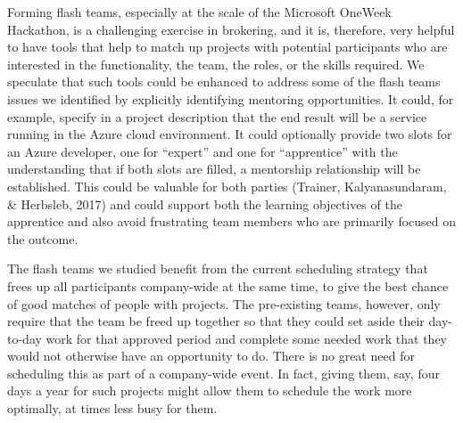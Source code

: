 \documentclass{hcij}
\begin{document}
Forming flash teams, especially at the scale of the Microsoft OneWeek Hackathon, is a challenging exercise in brokering, and it is, therefore, very helpful to have tools that help to match up projects with potential participants who are interested in the functionality, the team, the roles, or the skills required. We speculate that such tools could be enhanced to address some of the flash teams issues we identified by explicitly identifying mentoring opportunities. It could, for example, specify in a project description that the end result will be a service running in the Azure cloud environment. It could optionally provide two slots for an Azure developer, one for “expert” and one for “apprentice” with the understanding that if both slots are filled, a mentorship relationship will be established. This could be valuable for both parties (Trainer, Kalyanasundaram, & Herbsleb, 2017) and could support both the learning objectives of the apprentice and also avoid frustrating team members who are primarily focused on the outcome.

The flash teams we studied benefit from the current scheduling strategy that frees up all participants company-wide at the same time, to give the best chance of good matches of people with projects.  The pre-existing teams, however, only require that the team be freed up together so that they could set aside their day-to-day work for that approved period and complete some needed work that they would not otherwise have an opportunity to do. There is no great need for scheduling this as part of a company-wide event. In fact, giving them, say, four days a year for such projects might allow them to schedule the work more optimally, at times less busy for them.
\end{document}
